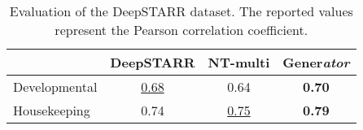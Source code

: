 \begin{table}[!htb]
\small
\renewcommand{\arraystretch}{1}
\centering
\caption{Evaluation of the DeepSTARR dataset. The reported values represent the Pearson correlation coefficient.}
\begin{tabular}{lccc}
\toprule
 & DeepSTARR & NT-multi & \textbf{Gener}\textit{ator} \\
\midrule
Developmental & \underline{0.68} & 0.64 & \textbf{0.70} \\
Housekeeping & 0.74 & \underline{0.75} & \textbf{0.79} \\
\bottomrule
\end{tabular}
\label{tab:enhancer_benchmark}
\end{table}